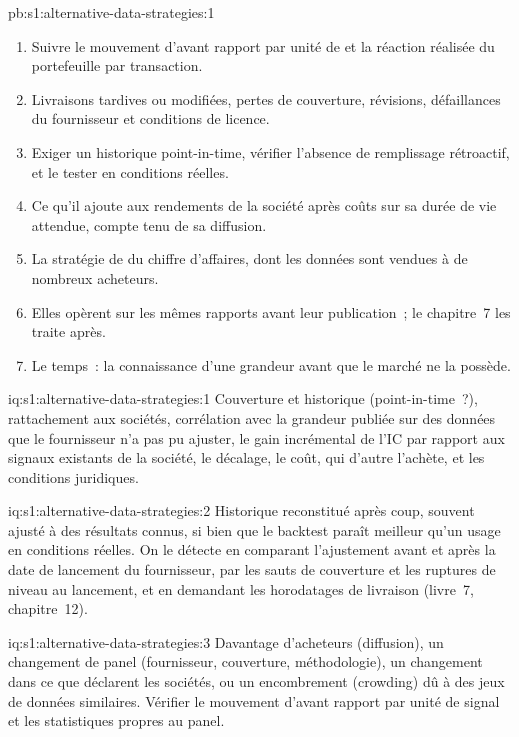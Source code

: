 \begin{solution}{pb:s1:alternative-data-strategies:1}
\begin{enumerate}
$-0.43$ à neuf dixièmes, tandis qu'une société qui reçoit le panel un jour plus tôt conserve 4.28 à 4.43.
\item Suivre le mouvement d'avant rapport par unité de  et la réaction réalisée du portefeuille par transaction.
\item Livraisons tardives ou modifiées, pertes de couverture, révisions, défaillances du fournisseur et conditions de licence.
\item Exiger un historique point-in-time, vérifier l'absence de remplissage rétroactif, et le tester en conditions réelles.
\item Ce qu'il ajoute aux rendements de la société après coûts sur sa durée de vie attendue, compte tenu de sa diffusion.
\item La stratégie de  du chiffre d'affaires, dont les données sont vendues à de nombreux acheteurs.
\item Elles opèrent sur les mêmes rapports avant leur publication~; le chapitre~7 les traite après.
\item Le temps~: la connaissance d'une grandeur avant que le marché ne la possède.
\end{enumerate}
\end{solution}

\begin{solution}{iq:s1:alternative-data-strategies:1}
Couverture et historique (point-in-time~?), rattachement aux sociétés, corrélation avec la grandeur publiée sur des données que le fournisseur n'a pas pu ajuster, le
gain incrémental de l'IC par rapport aux signaux existants de la société, le décalage, le coût, qui d'autre l'achète, et les conditions juridiques.
\end{solution}

\begin{solution}{iq:s1:alternative-data-strategies:2}
Historique reconstitué après coup, souvent ajusté à des résultats connus, si bien que le backtest paraît meilleur qu'un usage en conditions réelles. On le détecte en comparant l'ajustement avant et
après la date de lancement du fournisseur, par les sauts de couverture et les ruptures de niveau au lancement, et en demandant les horodatages de livraison (livre~7, chapitre~12).
\end{solution}

\begin{solution}{iq:s1:alternative-data-strategies:3}
Davantage d'acheteurs (diffusion), un changement de panel (fournisseur, couverture, méthodologie), un changement dans ce que déclarent les sociétés, ou un encombrement (crowding) dû à des jeux de données similaires.
Vérifier le mouvement d'avant rapport par unité de signal et les statistiques propres au panel.
\end{solution}

